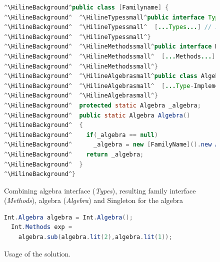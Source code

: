 \documentclass{report}
\newcommand{\HilineBackground}{}
\newcommand{\HilineTypessmall}{}
\newcommand{\HilineMethodssmall}{}
\newcommand{\HilineAlgebrasmall}{}
\begin{document}
\begin{figure}[H]
\vspace{-15pt}
\begin{lstlisting}[language=java]
^\HilineBackground^public class [Familyname] {
^\HilineBackground^  ^\HilineTypessmall^public interface Types<A> {
^\HilineBackground^  ^\HilineTypessmall^  [...Types...] // see Fig. ^\color{gray}\ref{algebraInterfaces}^
^\HilineBackground^  ^\HilineTypessmall^} 
^\HilineBackground^  ^\HilineMethodssmall^public interface Methods {
^\HilineBackground^  ^\HilineMethodssmall^  [...Methods...] // see Fig. ^\color{gray}\ref{dynamicDispatchMethods}^
^\HilineBackground^  ^\HilineMethodssmall^} 
^\HilineBackground^  ^\HilineAlgebrasmall^public class Algebra implements Types<Methods> { 
^\HilineBackground^  ^\HilineAlgebrasmall^  [...Type-Implementation...] // see Fig. ^\color{gray}\ref{dynamicDispatchAlgebra}^
^\HilineBackground^  ^\HilineAlgebrasmall^}
^\HilineBackground^  protected static Algebra _algebra;
^\HilineBackground^  public static Algebra Algebra()
^\HilineBackground^  { 
^\HilineBackground^    if(_algebra == null)
^\HilineBackground^      _algebra = new [FamilyName]().new Algebra();
^\HilineBackground^    return _algebra;
^\HilineBackground^  }
^\HilineBackground^}
\end{lstlisting}
\vspace{-12pt}
\caption{Combining algebra interface (\emph{Types}), resulting family interface (\emph{Methods}), algebra (\emph{Algebra}) and Singleton for the algebra}
\label{combinedClass}
\end{figure}

\begin{figure}[H]
\begin{lstlisting}[language=java]
  Int.Algebra algebra = Int.Algebra();
  Int.Methods exp = 
    algebra.sub(algebra.lit(2),algebra.lit(1));
\end{lstlisting}
\caption{Usage of the solution.}
\label{combinedClassUsage}
\end{figure}
\end{document}
